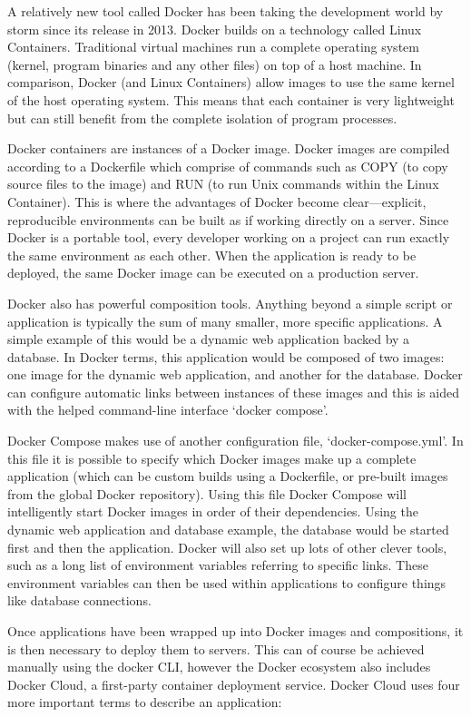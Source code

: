     A relatively new tool called Docker has been taking the development world by storm since its release in 2013. Docker builds on a technology called Linux Containers. Traditional virtual machines run a complete operating system (kernel, program binaries and any other files) on top of a host machine. In comparison, Docker (and Linux Containers) allow images to use the same kernel of the host operating system. This means that each container is very lightweight but can still benefit from the complete isolation of program processes.

    Docker containers are instances of a Docker image. Docker images are compiled according to a Dockerfile which comprise of commands such as COPY (to copy source files to the image) and RUN (to run Unix commands within the Linux Container). This is where the advantages of Docker become clear---explicit, reproducible environments can be built as if working directly on a server. Since Docker is a portable tool, every developer working on a project can run exactly the same environment as each other. When the application is ready to be deployed, the same Docker image can be executed on a production server.

    Docker also has powerful composition tools. Anything beyond a simple script or application is typically the sum of many smaller, more specific applications. A simple example of this would be a dynamic web application backed by a database. In Docker terms, this application would be composed of two images: one image for the dynamic web application, and another for the database. Docker can configure automatic links between instances of these images and this is aided with the helped command-line interface `docker compose'.

    Docker Compose makes use of another configuration file, `docker-compose.yml'. In this file it is possible to specify which Docker images make up a complete application (which can be custom builds using a Dockerfile, or pre-built images from the global Docker repository). Using this file Docker Compose will intelligently start Docker images in order of their dependencies. Using the dynamic web application and database example, the database would be started first and then the application. Docker will also set up lots of other clever tools, such as a long list of environment variables referring to specific links. These environment variables can then be used within applications to configure things like database connections.

    Once applications have been wrapped up into Docker images and compositions, it is then necessary to deploy them to servers. This can of course be achieved manually using the docker CLI, however the Docker ecosystem also includes Docker Cloud, a first-party container deployment service. Docker Cloud uses four more important terms to describe an application:

